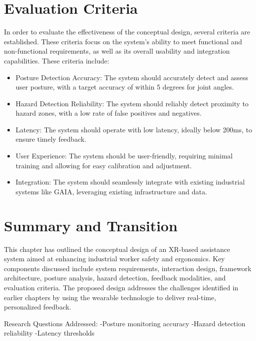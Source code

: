 \section{Evaluation Criteria}
In order to evaluate the effectiveness of the conceptual design, several criteria are established. These criteria focus on the system's ability to meet functional and non-functional requirements, as well as its overall usability and integration capabilities. 
These criteria include:
\begin{itemize}
    \item Posture Detection Accuracy: The system should accurately detect and assess user posture, with a target accuracy of within 5 degrees for joint angles.
    \item Hazard Detection Reliability: The system should reliably detect proximity to hazard zones, with a low rate of false positives and negatives.
    \item Latency: The system should operate with low latency, ideally below 200ms, to ensure timely feedback.
    \item User Experience: The system should be user-friendly, requiring minimal training and allowing for easy calibration and adjustment.
    \item Integration: The system should seamlessly integrate with existing industrial systems like GAIA, leveraging existing infrastructure and data.
\end{itemize}

\section{Summary and Transition}
This chapter has outlined the conceptual design of an XR-based assistance system aimed at enhancing industrial worker safety and ergonomics. Key components discussed include system requirements, interaction design, framework architecture, posture analysis, hazard detection, feedback modalities, and evaluation criteria. The proposed design addresses the challenges identified in earlier chapters by using the wearable technologie to deliver real-time, personalized feedback.

Research Questions Addressed:
-Posture monitoring accuracy
-Hazard detection reliability
-Latency thresholds
